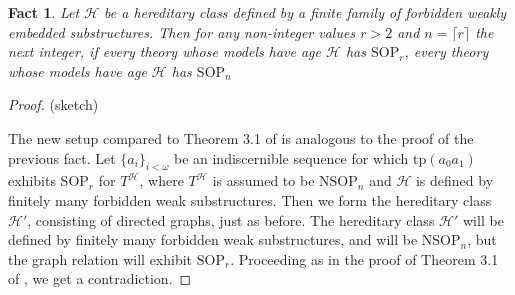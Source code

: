 \documentclass{amsart}
\newtheorem{fact}[theorem]{Fact}
\theoremstyle{definition}
\theoremstyle{remark}
\numberwithin{equation}{section}
\begin{document}
\begin{fact}
    Let $\mathcal{H}$ be a hereditary class defined by a finite family of forbidden weakly embedded substructures. Then for any non-integer values $r > 2$ and $n = \lceil r \rceil$ the next integer, if every theory whose models have age $\mathcal{H}$ has $\mathrm{SOP}_{r}$, every theory whose models have age $\mathcal{H}$ has $\mathrm{SOP}_{n}$
\end{fact}

\begin{proof}
   (sketch)
    
    The new setup compared to Theorem 3.1 of \cite{ApproxOrder} is analogous to the proof of the previous fact. Let $\{a_{i}\}_{i < \omega}$ be an indiscernible sequence for which $\mathrm{tp}(a_{0}a_{1})$ exhibits $\mathrm{SOP}_{r}$ for $T^{\mathcal{H}}$, where $T^{\mathcal{H}}$ is assumed to be $\mathrm{NSOP}_{n}$ and $\mathcal{H}$ is defined by finitely many forbidden weak substructures. Then we form the hereditary class $\mathcal{H}'$, consisting of directed graphs, just as before. The hereditary class $\mathcal{H}'$ will be defined by finitely many forbidden weak substructures, and will be $\mathrm{NSOP}_{n}$, but the graph relation will exhibit $\mathrm{SOP}_{r}$. Proceeding as in the proof of Theorem 3.1 of \cite{ApproxOrder}, we get a contradiction.
\end{proof}
\end{document}
